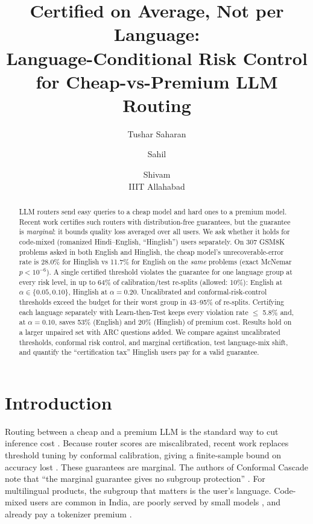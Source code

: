 \documentclass[11pt]{article}
\title{Certified on Average, Not per Language:\\
Language-Conditional Risk Control for Cheap-vs-Premium LLM Routing}
\author{Tushar Saharan \and Sahil \and Shivam\\ IIIT Allahabad}
\date{}
\begin{document}
\maketitle

\begin{abstract}
LLM routers send easy queries to a cheap model and hard ones to a premium model.
Recent work certifies such routers with distribution-free guarantees, but the guarantee
is \emph{marginal}: it bounds quality loss averaged over all users. We ask whether it
holds for code-mixed (romanized Hindi--English, ``Hinglish'') users separately.
On 307 GSM8K problems asked in both English and Hinglish, the cheap model's
unrecoverable-error rate is 28.0\% for Hinglish vs 11.7\% for English on the \emph{same}
problems (exact McNemar $p<10^{-6}$). A single certified threshold violates the guarantee
for one language group at every risk level, in up to 64\% of calibration/test re-splits
(allowed: 10\%): English at $\alpha\in\{0.05,0.10\}$, Hinglish at $\alpha=0.20$.
Uncalibrated and conformal-risk-control thresholds exceed the budget for their worst group
in 43--95\% of re-splits. Certifying each language separately with Learn-then-Test keeps every
violation rate $\le$ 5.8\% and, at $\alpha=0.10$, saves 53\% (English) and 20\% (Hinglish)
of premium cost. Results hold on a larger unpaired set with ARC questions added. We compare against uncalibrated thresholds,
conformal risk control, and marginal certification, test language-mix shift, and
quantify the ``certification tax'' Hinglish users pay for a valid guarantee.
\end{abstract}

\section{Introduction}
Routing between a cheap and a premium LLM is the standard way to cut inference cost
\citep{chen2023frugalgpt,ong2024routellm,ding2024hybrid,hu2024routerbench}.
Because router scores are miscalibrated, recent work replaces threshold tuning by
conformal calibration, giving a finite-sample bound on accuracy lost
\citep{dou2026conformalcascade,copRoute2026}. These guarantees are marginal. The
authors of Conformal Cascade note that ``the marginal guarantee gives no subgroup
protection'' \citep{dou2026conformalcascade}. For multilingual products, the subgroup that
matters is the user's language. Code-mixed users are common in India, are poorly served by
small models \citep{khanuja2020gluecos,indiromcom2026}, and already pay a tokenizer
premium \citep{petrov2023language}.
\end{document}
